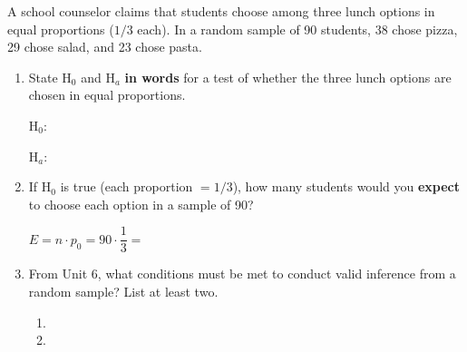 \documentclass[10pt]{article}
\begin{document}
\namedateperiod

\vspace{0.15in}

A school counselor claims that students choose among three lunch options in equal
proportions ($1/3$ each). In a random sample of 90 students, 38 chose pizza, 29 chose
salad, and 23 chose pasta.

\begin{enumerate}

  \item State H$_0$ and H$_a$ \textbf{in words} for a test of whether the three lunch
        options are chosen in equal proportions.

        H$_0$: 

        \vspace{0.05in}

        H$_a$: 

        \vspace{0.05in}

  \item If H$_0$ is true (each proportion $= 1/3$), how many students would you
        \textbf{expect} to choose each option in a sample of 90?

        \vspace{0.05in}
        $E = n \cdot p_0 = 90 \cdot \dfrac{1}{3} = $ 

        \vspace{0.1in}

  \item From Unit 6, what conditions must be met to conduct valid inference from a
        random sample? List at least two.

        \begin{enumerate}[label=\alph*.]
          \item {}
          \item {}
        \end{enumerate}

\end{enumerate}
\end{document}
